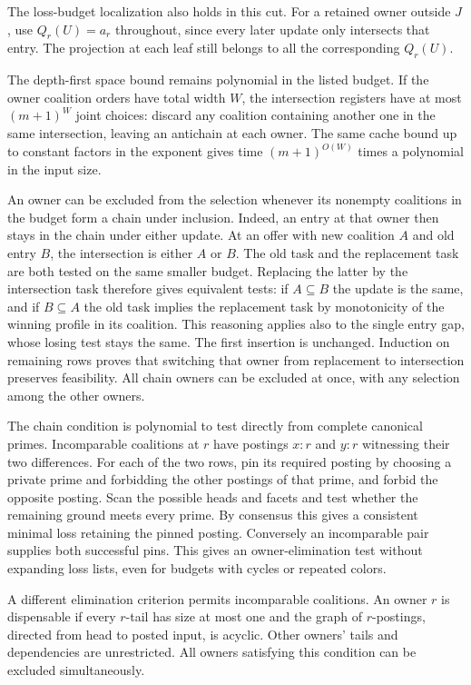 The loss-budget localization also holds in this cut.
For a retained owner outside $J$, use $Q_r(U)=a_r$
throughout, since every later update only intersects
that entry. The projection at each leaf still belongs
to all the corresponding $Q_r(U)$.

The depth-first space bound remains polynomial in the
listed budget. If the owner coalition orders have total
width $W$, the intersection registers have at most
$(m+1)^W$ joint choices: discard any coalition containing
another one in the same intersection, leaving an
antichain at each owner. The same cache bound up to
constant factors in the exponent gives time
$(m+1)^{O(W)}$ times a polynomial in the input size.

An owner can be excluded from the selection whenever
its nonempty coalitions in the budget form a chain
under inclusion. Indeed, an entry at that owner then
stays in the chain under either update. At an offer
with new coalition $A$ and old entry $B$, the
intersection is either $A$ or $B$. The old task and
the replacement task are both tested on the same
smaller budget. Replacing the latter by the
intersection task therefore gives equivalent tests:
if $A\subseteq B$ the update is the same, and if
$B\subseteq A$ the old task implies the replacement
task by monotonicity of the winning profile in its
coalition. This reasoning applies also to the single
entry gap, whose losing test stays the same.
The first insertion is unchanged. Induction on
remaining rows proves that switching that owner from
replacement to intersection preserves feasibility.
All chain owners can be excluded at once, with
any selection among the other owners.

The chain condition is polynomial to test directly
from complete canonical primes. Incomparable
coalitions at $r$ have postings $x:r$ and $y:r$
witnessing their two differences. For each of the
two rows, pin its required posting by choosing a
private prime and forbidding the other postings
of that prime, and forbid the opposite posting.
Scan the possible heads and facets and test
whether the remaining ground meets every prime.
By consensus this gives a consistent minimal
loss retaining the pinned posting. Conversely an
incomparable pair supplies both successful pins.
This gives an owner-elimination test without
expanding loss lists, even for budgets with cycles
or repeated colors.

A different elimination criterion permits incomparable
coalitions. An owner $r$ is dispensable if every
$r$-tail has size at most one and the graph of
$r$-postings, directed from head to posted input,
is acyclic. Other owners' tails and dependencies
are unrestricted. All owners satisfying this
condition can be excluded simultaneously.

